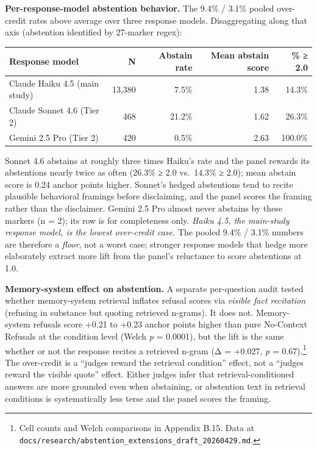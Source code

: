 \textbf{Per-response-model abstention behavior.} The 9.4\% / 3.1\%
pooled over-credit rates above average over three response models.
Disaggregating along that axis (abstention identified by 27-marker
regex):

\begin{longtable}[]{@{}lrrrr@{}}
\toprule
Response model & N & Abstain rate & Mean abstain score & \% ≥ 2.0 \\
\midrule
\endhead
Claude Haiku 4.5 (main study) & 13,380 & 7.5\% & 1.38 & 14.3\% \\
Claude Sonnet 4.6 (Tier 2) & 468 & 21.2\% & 1.62 & 26.3\% \\
Gemini 2.5 Pro (Tier 2) & 420 & 0.5\% & 2.63 & 100.0\% \\
\bottomrule
\end{longtable}

Sonnet 4.6 abstains at roughly three times Haiku's rate and the panel
rewards its abstentions nearly twice as often (26.3\% ≥ 2.0 vs.~14.3\% ≥
2.0); mean abstain score is 0.24 anchor points higher. Sonnet's hedged
abstentions tend to recite plausible behavioral framings before
disclaiming, and the panel scores the framing rather than the
disclaimer. Gemini 2.5 Pro almost never abstains by these markers (n =
2); its row is for completeness only. \emph{Haiku 4.5, the main-study
response model, is the lowest over-credit case.} The pooled 9.4\% /
3.1\% numbers are therefore a \emph{floor}, not a worst case; stronger
response models that hedge more elaborately extract more lift from the
panel's reluctance to score abstentions at 1.0.

\textbf{Memory-system effect on abstention.} A separate per-question
audit tested whether memory-system retrieval inflates refusal scores via
\emph{visible fact recitation} (refusing in substance but quoting
retrieved n-grams). It does not. Memory-system refusals score +0.21 to
+0.23 anchor points higher than pure No-Context Refusals at the
condition level (Welch \emph{p} = 0.0001), but the lift is the same
whether or not the response recites a retrieved n-gram (Δ = +0.027,
\emph{p} = 0.67).\footnote{Cell counts and Welch comparisons in Appendix
  B.15. Data at
  \texttt{docs/research/abstention\_extensions\_draft\_20260429.md}.}
The over-credit is a ``judges reward the retrieval condition'' effect,
not a ``judges reward the visible quote'' effect. Either judges infer
that retrieval-conditioned answers are more grounded even when
abstaining, or abstention text in retrieval conditions is systematically
less terse and the panel scores the framing.

